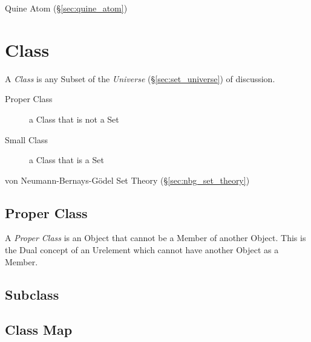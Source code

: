 Quine Atom (\S\ref{sec:quine_atom})



\section{Class}\label{sec:class}

A \emph{Class} is any Subset of the \emph{Universe} (\S\ref{sec:set_universe})
of discussion.

\begin{description}
  \item [Proper Class] a Class that is not a Set
  \item [Small Class] a Class that is a Set
\end{description}

\fist von Neumann-Bernays-G\"odel Set Theory (\S\ref{sec:nbg_set_theory})



\subsection{Proper Class}\label{sec:proper_class}

A \emph{Proper Class} is an Object that cannot be a Member of another Object.
This is the Dual concept of an Urelement which cannot have another Object as a
Member.



\subsection{Subclass}\label{sec:subclass}

\subsection{Class Map}\label{sec:class_map}



